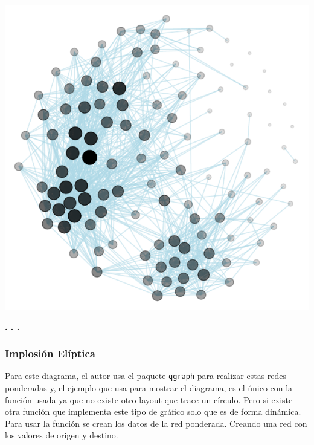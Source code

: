\documentclass{article}\usepackage[]{graphicx}\usepackage[]{color}
\makeatletter
\def\maxwidth{ %
  \ifdim\Gin@nat@width>\linewidth
    \linewidth
  \else
    \Gin@nat@width
  \fi
}
\newenvironment{knitrout}{}{} %
\makeatother
\begin{document}
\begin{knitrout}
\color{fgcolor}

{\centering \includegraphics[width=\maxwidth]{figure/explo_red-1} 

}



\end{knitrout}
\begin{center}
\textbf{. . .}
\end{center}
\subsubsection{Implosi\'on El\'iptica}
Para este diagrama, el autor usa el paquete \texttt{qgraph}\cite{docu_qgraph} para realizar estas redes ponderadas y, el ejemplo que usa para mostrar el diagrama, es el \'unico con la funci\'on usada ya que no existe otro layout que trace un c\'irculo. Pero si existe otra funci\'on que implementa este tipo de gr\'afico solo que es de forma din\'amica.~\\
Para usar la funci\'on se crean los datos de la red ponderada. Creando una red con los valores de origen y destino.
\end{document}
